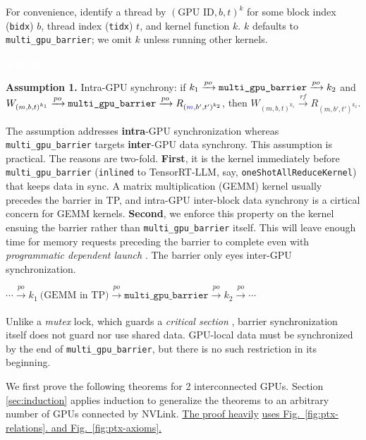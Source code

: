 \documentclass[acmsmall]{acmart}
\begin{document}
\noindent For convenience, identify a thread by ${(\text{GPU ID}, b, t)}^k$ for some block index (\verb|bidx|) $b$, thread index (\verb|tidx|) $t$, and kernel function $k$. $k$ defaults to \verb|multi_gpu_barrier|; we omit $k$ unless running other kernels.

\textcolor{white}{delimiter}

\noindent\textbf{Assumption 1.} Intra-GPU synchrony: if $k_1 \xrightarrow[]{po} \verb|multi_gpu_barrier| \xrightarrow[]{po} k_2$ and $W_{{(m,b,t)}^{k_1}} \xrightarrow[]{po} \verb|multi_gpu_barrier| \xrightarrow[]{po} R_{{(\textcolor{blue}{m},b',t')}^{k_2}}$, then $W_{{(m,b,t)}^{k_1}} \xrightarrow[]{rf} R_{{(m,b',t')}^{k_2}}$.

The assumption addresses \textbf{intra}-GPU synchronization whereas \verb|multi_gpu_barrier| targets \textbf{inter}-GPU data synchrony. This assumption is practical. The reasons are two-fold. \textbf{First}, it is the kernel immediately before \verb|multi_gpu_barrier| (\verb|inlined| to TensorRT-LLM, say, \verb|oneShotAllReduceKernel|) that keeps data in sync. A matrix multiplication (GEMM) kernel usually precedes the barrier in TP, and intra-GPU inter-block data synchrony is a cirtical concern for GEMM kernels. \textbf{Second}, we enforce this property on the kernel ensuing the barrier rather than \verb|multi_gpu_barrier| itself. This will leave enough time for memory requests preceding the barrier to complete even with \textit{programmatic dependent launch} \cite{cuda}. The barrier only eyes inter-GPU synchronization.

\begin{center}
$\cdots \xrightarrow[]{po} k_1~\text{(GEMM in TP)} \xrightarrow[]{po} \texttt{multi\_gpu\_barrier} \xrightarrow[]{po} k_2 \xrightarrow[]{po} \cdots$
\end{center}

Unlike a \textit{mutex} lock, which guards a \textit{critical section }, barrier synchronization itself does not guard nor use shared data. GPU-local data must be synchronized by the end of \verb|multi_gpu_barrier|, but there is no such restriction in its beginning.

\noindent\textcolor{gray}{\hrulefill}
\vspace{4pt}

\noindent We first prove the following theorems for 2 interconnected GPUs. Section \ref{sec:induction} applies induction to generalize the theorems to an arbitrary number of GPUs connected by NVLink. \underline{The proof heavily} \underline{uses Fig.~\ref{fig:ptx-relations}. and Fig.~\ref{fig:ptx-axioms}.}
\end{document}
